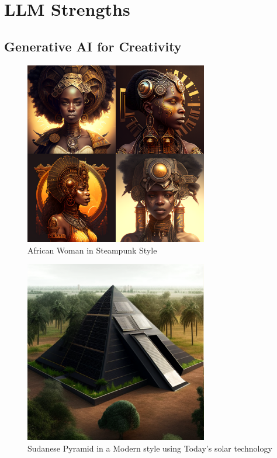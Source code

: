 \section{LLM Strengths}
\subsection{Generative AI for Creativity}

\begin{figure}[ht]
    \includegraphics[width=8cm]{imgs/african_woman_steampunk.eps}
    \caption{African Woman in Steampunk Style}
\end{figure}

\begin{figure}[ht]
    \includegraphics[width=8cm]{imgs/sudanese_solar_pyramid.eps}
    \caption{Sudanese Pyramid in a Modern style using Today's solar technology}
\end{figure}